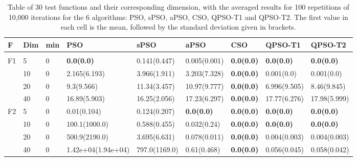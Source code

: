 \begin{longtable}{|l|l|l|l|l|l|l|l|l|}
\hline
F              & Dim & min      & PSO                           & sPSO                        & aPSO                    & CSO                       & QPSO-T1                & QPSO-T2               \\ \hline
\endhead
\midrule
\endfoot
\hline
\multicolumn{9}{c}{} \\
\caption{Table of 30 test functions and their corresponding dimension, with the averaged results for 100 repetitions of 10,000 iterations for the 6 algorithms: PSO, sPSO, aPSO, CSO, QPSO-T1 and QPSO-T2. The first value in each cell is the mean, followed by the standard deviation given in brackets.}
\endlastfoot
F1             & 5   & 0        & \textbf{0.0(0.0)}             & 0.141(0.447)                & 0.005(0.001)            & \textbf{0.0(0.0)}         & \textbf{0.0(0.0)}      & \textbf{0.0(0.0)}     \\
\cmidrule{2-9} & 10  & 0        & 2.165(6.193)                  & 3.966(1.911)                & 3.203(7.328)            & \textbf{0.0(0.0)}         & 0.001(0.0)             & 0.001(0.0)            \\
\cmidrule{2-9} & 20  & 0        & 9.3(9.566)                    & 11.34(3.457)                & 10.97(9.777)            & \textbf{0.0(0.0)}         & 6.996(9.505)           & 8.46(9.845)           \\
\cmidrule{2-9} & 40  & 0        & 16.89(5.903)                  & 16.25(2.056)                & 17.23(6.297)            & \textbf{0.0(0.0)}         & 17.77(6.276)           & 17.98(5.999)          \\ \hline
F2             & 5   & 0        & 0.01(0.104)                   & 0.124(0.207)                & \textbf{0.0(0.0)}       & \textbf{0.0(0.0)}         & \textbf{0.0(0.0)}      & \textbf{0.0(0.0)}     \\
\cmidrule{2-9} & 10  & 0        & 100.1(1000.0)                 & 0.588(0.455)                & 0.032(0.24)             & \textbf{0.0(0.0)}         & \textbf{0.0(0.0)}      & \textbf{0.0(0.0)}     \\
\cmidrule{2-9} & 20  & 0        & 500.9(2190.0)                 & 3.695(6.631)                & 0.078(0.011)            & \textbf{0.0(0.0)}         & 0.004(0.003)           & 0.004(0.003)          \\
\cmidrule{2-9} & 40  & 0        & 1.42e+04(1.94e+04)            & 797.0(1169.0)               & 0.61(0.468)             & \textbf{0.0(0.0)}         & 0.056(0.045)           & 0.058(0.042)          \\ \hline

\end{longtable}
